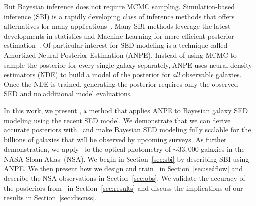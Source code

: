 But Bayesian inference does not require MCMC sampling.  
Simulation-based inference (SBI) is a rapidly developing class of inference
methods that offers alternatives for many applications~\citep[see][and
references therein]{cranmer2020}.
Many SBI methods leverage the latest developments in statistics and Machine
Learning for more efficient posterior estimation~\citep{papamakarios2017,
alsing2019a, hahn2019c, dax2021, huppenkothen2021, zhang2021}. 
Of particular interest for SED modeling is a technique called Amortized
Neural Posterior Estimation (ANPE). 
Instead of using MCMC to sample the posterior for every single galaxy
separately, ANPE uses neural density estimators (NDE) to build a model of the
posterior for \emph{all} observable galaxies.
Once the NDE is trained, generating the posterior requires only the observed
SED and no additional model evaluations.

In this work, we present \sedflow, a method that applies ANPE to Bayesian
galaxy SED modeling using the recent \cite{hahn2022} SED model. 
We demonstrate that we can derive accurate posteriors with \sedflow~and make
Bayesian SED modeling fully scalable for the billions of galaxies that will be
observed by upcoming surveys.
As further demonstration, we apply \sedflow~to the optical photometry of
${\sim}33,000$ galaxies in the NASA-Sloan Atlas~(NSA). 
We begin in Section~\ref{sec:sbi} by describing SBI using ANPE.
We then present how we design and train \sedflow~in Section~\ref{sec:sedflow}
and describe the NSA observations in Section~\ref{sec:obs}. 
We validate the accuracy of the posteriors from \sedflow~in
Section~\ref{sec:results} and discuss the implications of our results in
Section~\ref{sec:discuss}. 
